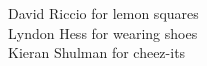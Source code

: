 \documentclass[preview]{standalone}
\begin{document}
David Riccio for lemon squares\\Lyndon Hess for wearing shoes\\Kieran Shulman for cheez-its\\
\end{document}
